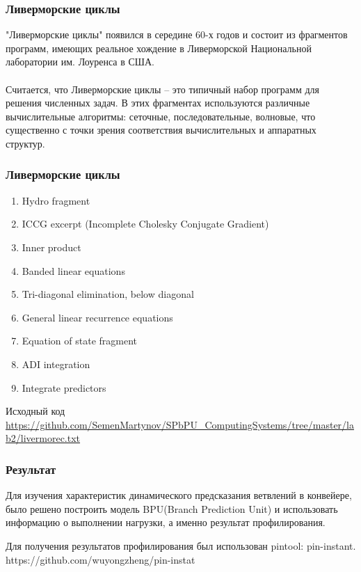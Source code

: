 \documentclass{beamer}
\begin{document}
\begin{frame}
\frametitle{Ливерморские циклы}
"Ливерморские циклы" появился в середине 60-х годов и состоит из фрагментов программ, имеющих реальное хождение в Ливерморской Национальной лаборатории им. Лоуренса в США.\\~\\

Считается, что Ливерморские циклы -- это типичный набор программ для решения численных задач. В этих фрагментах используются различные вычислительные алгоритмы: сеточные, последовательные, волновые, что существенно с точки зрения соответствия вычислительных и аппаратных структур.
\end{frame}


\begin{frame}
\frametitle{Ливерморские циклы}
\begin{enumerate}
\item Hydro fragment
\item ICCG excerpt (Incomplete Cholesky Conjugate Gradient)
\item Inner product
\item Banded linear equations
\item Tri-diagonal elimination, below diagonal
\item General linear recurrence equations
\item Equation of state fragment
\item ADI integration
\item Integrate predictors
\end{enumerate}
Исходный код \url{https://github.com/SemenMartynov/SPbPU_ComputingSystems/tree/master/lab2/livermorec.txt}
\end{frame}

\begin{frame}
\frametitle{Результат}

Для изучения характеристик динамического предсказания ветвлений в конвейере, было решено построить модель BPU(Branch Prediction Unit) и использовать информацию о выполнении нагрузки, а именно результат профилирования.

Для получения результатов профилирования был использован pintool: pin-instant. 
https://github.com/wuyongzheng/pin-instat


\end{frame}
\end{document}
